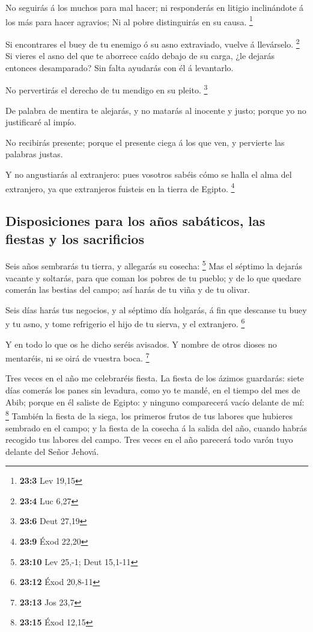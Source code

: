  No seguirás á los muchos para mal hacer; ni responderás
en litigio inclinándote á los más para hacer agravios;  Ni
al pobre distinguirás en su causa. \footnote{\textbf{23:3} Lev 19,15}

 Si encontrares el buey de tu enemigo ó su asno
extraviado, vuelve á llevárselo. \footnote{\textbf{23:4} Luc 6,27}
 Si vieres el asno del que te aborrece caído debajo de su
carga, ¿le dejarás entonces desamparado? Sin falta ayudarás con él á
levantarlo.

 No pervertirás el derecho de tu mendigo en su pleito.
\footnote{\textbf{23:6} Deut 27,19}

 De palabra de mentira te alejarás, y no matarás al
inocente y justo; porque yo no justificaré al impío.

 No recibirás presente; porque el presente ciega á los que
ven, y pervierte las palabras justas.

 Y no angustiarás al extranjero: pues vosotros sabéis cómo
se halla el alma del extranjero, ya que extranjeros fuisteis en la
tierra de Egipto. \footnote{\textbf{23:9} Éxod 22,20}

\hypertarget{disposiciones-para-los-auxf1os-sabuxe1ticos-las-fiestas-y-los-sacrificios}{%
\subsection{Disposiciones para los años sabáticos, las fiestas y los
sacrificios}\label{disposiciones-para-los-auxf1os-sabuxe1ticos-las-fiestas-y-los-sacrificios}}

 Seis años sembrarás tu tierra, y allegarás su cosecha:
\footnote{\textbf{23:10} Lev 25,-1; Deut 15,1-11}  Mas el
séptimo la dejarás vacante y soltarás, para que coman los pobres de tu
pueblo; y de lo que quedare comerán las bestias del campo; así harás de
tu viña y de tu olivar.

 Seis días harás tus negocios, y al séptimo día holgarás,
á fin que descanse tu buey y tu asno, y tome refrigerio el hijo de tu
sierva, y el extranjero. \footnote{\textbf{23:12} Éxod 20,8-11}

 Y en todo lo que os he dicho seréis avisados. Y nombre
de otros dioses no mentaréis, ni se oirá de vuestra boca. \footnote{\textbf{23:13}
  Jos 23,7}

 Tres veces en el año me celebraréis fiesta.
 La fiesta de los ázimos guardarás: siete días comerás
los panes sin levadura, como yo te mandé, en el tiempo del mes de Abib;
porque en él saliste de Egipto: y ninguno comparecerá vacío delante de
mí: \footnote{\textbf{23:15} Éxod 12,15}  También la
fiesta de la siega, los primeros frutos de tus labores que hubieres
sembrado en el campo; y la fiesta de la cosecha á la salida del año,
cuando habrás recogido tus labores del campo.  Tres veces
en el año parecerá todo varón tuyo delante del Señor Jehová.

